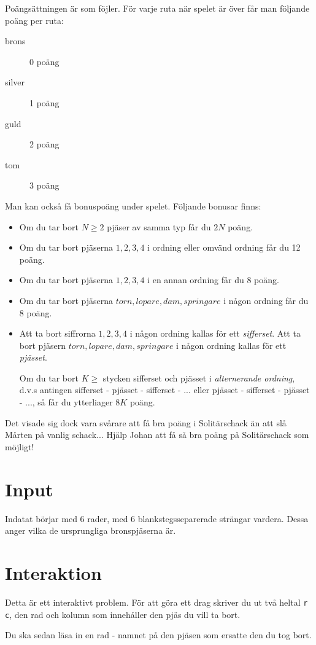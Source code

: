 Poängsättningen är som föjler. För varje ruta när spelet är över får man följande poäng per ruta:
\begin{description}
	\item[brons] 0 poäng
	\item[silver] 1 poäng
	\item[guld] 2 poäng
	\item[tom] 3 poäng
\end{description}
Man kan också få bonuspoäng under spelet. Följande bonusar finns:
\begin{itemize}
	\item Om du tar bort $N \ge 2$ pjäser av samma typ får du $2N$ poäng.
	\item Om du tar bort pjäserna $1, 2, 3, 4$ i ordning eller omvänd ordning får du 12 poäng.
	\item Om du tar bort pjäserna $1, 2, 3, 4$ i en annan ordning får du 8 poäng.
	\item Om du tar bort pjäserna $torn, lopare, dam, springare$ i någon ordning får du 8 poäng.
	\item Att ta bort siffrorna $1, 2, 3, 4$ i någon ordning kallas för ett \emph{sifferset}.
		Att ta bort pjäsern $torn, lopare, dam, springare$ i någon ordning kallas för ett \emph{pjässet}.

		Om du tar bort $K \ge$ stycken sifferset och pjässet i \emph{alternerande ordning}, d.v.s antingen
		sifferset - pjässet - sifferset - ... eller pjässet - sifferset - pjässet - ..., så får du
		ytterliager $8K$ poäng.
\end{itemize}

Det visade sig dock vara svårare att få bra poäng i Solitärschack än att slå Mårten på vanlig schack... Hjälp Johan att få så
bra poäng på Solitärschack som möjligt!

\section*{Input}
Indatat börjar med 6 rader, med 6 blankstegsseparerade strängar vardera. Dessa anger vilka de ursprungliga
bronspjäserna är.

\section*{Interaktion}
Detta är ett interaktivt problem. För att göra ett drag skriver du ut två heltal \texttt{r c}, den rad och kolumn som
innehåller den pjäs du vill ta bort.

Du ska sedan läsa in en rad - namnet på den pjäsen som ersatte den du tog bort.

